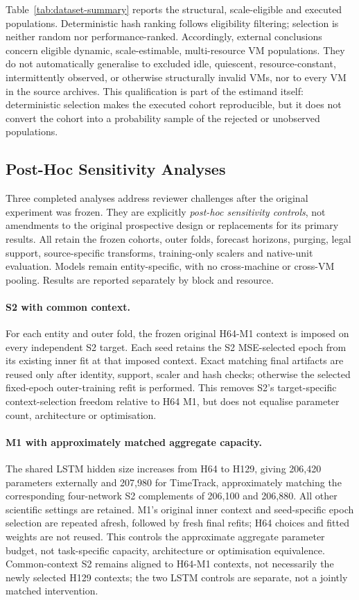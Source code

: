 \documentclass[a4paper,fleqn]{cas-dc}
\begin{document}
Table~\ref{tab:dataset-summary} reports the structural, scale-eligible and
executed populations. Deterministic hash ranking follows eligibility
filtering; selection is neither random nor performance-ranked. Accordingly, external
conclusions concern eligible dynamic, scale-estimable, multi-resource VM
populations.  They do not automatically generalise to excluded idle,
quiescent, resource-constant, intermittently observed, or otherwise
structurally invalid VMs, nor to every VM in the source archives.  This
qualification is part of the estimand itself: deterministic selection makes the
executed cohort reproducible, but it does not convert the cohort into a
probability sample of the rejected or unobserved populations.

\subsection{Post-Hoc Sensitivity Analyses}
\label{sec:posthoc-controls}

Three completed analyses address reviewer challenges after the original
experiment was frozen. They are explicitly \emph{post-hoc sensitivity
controls}, not amendments to the original prospective design or replacements
for its primary results. All retain the frozen cohorts, outer folds,
forecast horizons, purging, legal support, source-specific transforms,
training-only scalers and native-unit evaluation. Models remain
entity-specific, with no cross-machine or cross-VM pooling. Results are
reported separately by block and resource.

\paragraph{S2 with common context.}
For each entity and outer fold, the frozen original H64-M1 context is imposed
on every independent S2 target. Each seed retains the S2 MSE-selected epoch
from its existing inner fit at that imposed context. Exact matching final
artifacts are reused only after identity, support, scaler and hash checks;
otherwise the selected fixed-epoch outer-training refit is performed.
This removes S2's target-specific context-selection freedom relative to
H64 M1, but does not equalise parameter count, architecture or optimisation.

\paragraph{M1 with approximately matched aggregate capacity.}
The shared LSTM hidden size increases from H64 to H129, giving 206,420
parameters externally and 207,980 for TimeTrack, approximately matching the
corresponding four-network S2 complements of 206,100 and 206,880. All other
scientific settings are retained. M1's original inner context and
seed-specific epoch selection are repeated afresh, followed by fresh final
refits; H64 choices and fitted weights are not reused. This controls the
approximate aggregate parameter budget, not task-specific capacity,
architecture or optimisation equivalence. Common-context S2 remains aligned
to H64-M1 contexts, not necessarily the newly selected H129 contexts; the
two LSTM controls are separate, not a jointly matched intervention.
\end{document}
